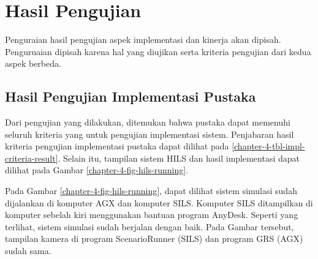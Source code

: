 \section{Hasil Pengujian}

Penguraian hasil pengujian aspek implementasi dan kinerja akan dipisah.
Penguruaian dipisah karena hal yang diujikan serta kriteria pengujian dari kedua
aspek berbeda.

\subsection{Hasil Pengujian Implementasi Pustaka}

Dari pengujian yang dilakukan, ditemukan bahwa pustaka dapat memenuhi seluruh
kriteria yang untuk pengujian implementasi sistem. Penjabaran hasil
kriteria pengujian implementasi pustaka dapat dilihat pada
\ref{chapter-4-tbl-impl-criteria-result}. Selain itu, tampilan sistem HILS dan
hasil implementasi dapat dilihat pada Gambar \ref{chapter-4-fig-hils-running}.

Pada Gambar \ref{chapter-4-fig-hils-running}, dapat dilihat sistem simulasi
sudah dijalankan di komputer AGX dan komputer SILS. Komputer SILS ditampilkan di
komputer sebelah kiri menggunakan bantuan program AnyDesk. Seperti yang
terlihat, sistem simulasi sudah berjalan dengan baik. Pada Gambar tersebut,
tampilan kamera di program ScenarioRunner (SILS) dan program GRS (AGX) sudah
sama.


